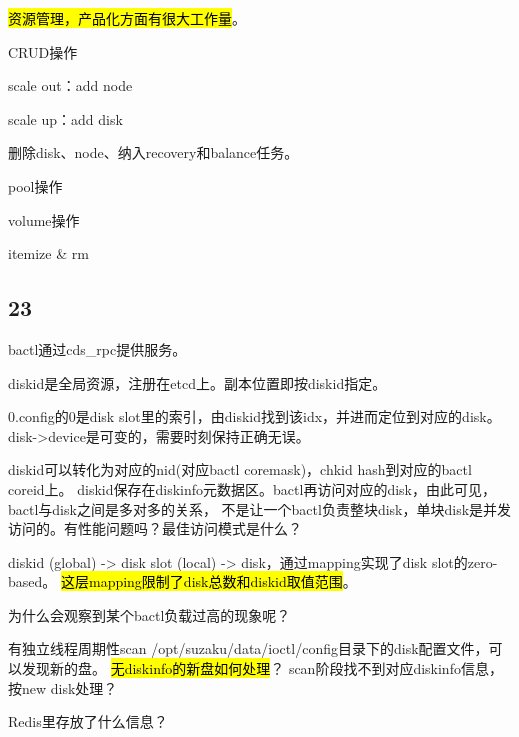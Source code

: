 \hrulefill

\hl{资源管理，产品化方面有很大工作量}。

CRUD操作

scale out：add node

scale up：add disk

删除disk、node、纳入recovery和balance任务。

pool操作

volume操作
\begin{myeasylist}{itemize}
& rm
\end{myeasylist}

\subsection{23}

bactl通过cds\_rpc提供服务。

diskid是全局资源，注册在etcd上。副本位置即按diskid指定。

0.config的0是disk slot里的索引，由diskid找到该idx，并进而定位到对应的disk。
disk->device是可变的，需要时刻保持正确无误。

diskid可以转化为对应的nid(对应bactl coremask)，chkid hash到对应的bactl coreid上。
diskid保存在diskinfo元数据区。bactl再访问对应的disk，由此可见，bactl与disk之间是多对多的关系，
不是让一个bactl负责整块disk，单块disk是并发访问的。有性能问题吗？最佳访问模式是什么？

diskid (global) -> disk slot (local) -> disk，通过mapping实现了disk slot的zero-based。
\hl{这层mapping限制了disk总数和diskid取值范围}。

为什么会观察到某个bactl负载过高的现象呢？

有独立线程周期性scan /opt/suzaku/data/ioctl/config目录下的disk配置文件，可以发现新的盘。
\hl{无diskinfo的新盘如何处理}？ scan阶段找不到对应diskinfo信息，按new disk处理？

Redis里存放了什么信息？
